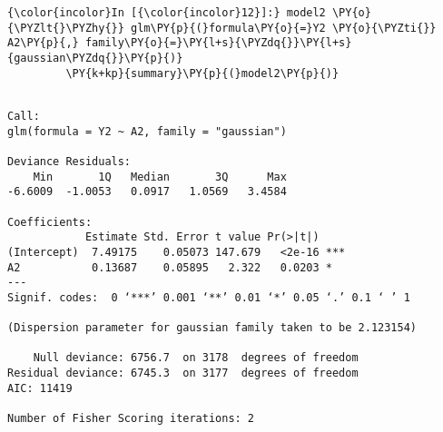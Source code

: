 
    
    \begin{Verbatim}[commandchars=\\\{\}]
{\color{incolor}In [{\color{incolor}12}]:} model2 \PY{o}{\PYZlt{}\PYZhy{}} glm\PY{p}{(}formula\PY{o}{=}Y2 \PY{o}{\PYZti{}} A2\PY{p}{,} family\PY{o}{=}\PY{l+s}{\PYZdq{}}\PY{l+s}{gaussian\PYZdq{}}\PY{p}{)}
         \PY{k+kp}{summary}\PY{p}{(}model2\PY{p}{)}
\end{Verbatim}


    
    \begin{verbatim}

Call:
glm(formula = Y2 ~ A2, family = "gaussian")

Deviance Residuals: 
    Min       1Q   Median       3Q      Max  
-6.6009  -1.0053   0.0917   1.0569   3.4584  

Coefficients:
            Estimate Std. Error t value Pr(>|t|)    
(Intercept)  7.49175    0.05073 147.679   <2e-16 ***
A2           0.13687    0.05895   2.322   0.0203 *  
---
Signif. codes:  0 ‘***’ 0.001 ‘**’ 0.01 ‘*’ 0.05 ‘.’ 0.1 ‘ ’ 1

(Dispersion parameter for gaussian family taken to be 2.123154)

    Null deviance: 6756.7  on 3178  degrees of freedom
Residual deviance: 6745.3  on 3177  degrees of freedom
AIC: 11419

Number of Fisher Scoring iterations: 2

    \end{verbatim}

   
